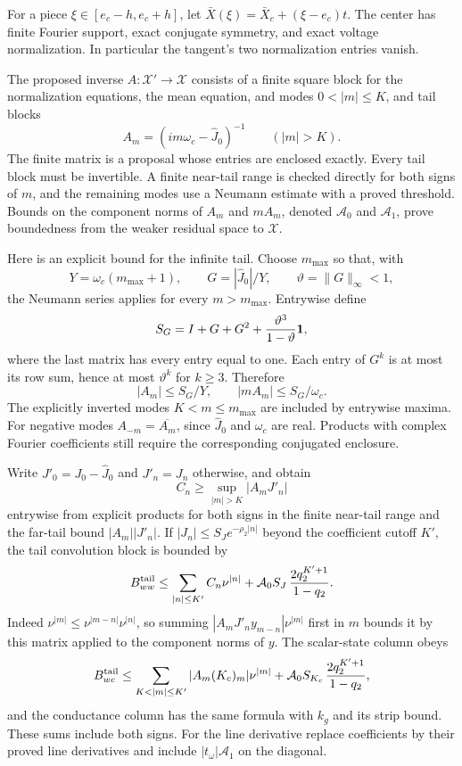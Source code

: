\documentclass[11pt]{article}
\theoremstyle{definition}
\begin{document}
For a piece $\xi\in[e_c-h,e_c+h]$, let
$\bar X(\xi)=\bar X_c+(\xi-e_c)t$.
The center has finite Fourier support, exact conjugate symmetry, and exact voltage normalization. In particular the tangent's two normalization entries vanish.

The proposed inverse $A:\mathcal X'\to\mathcal X$ consists of a finite square block for the normalization equations, the mean equation, and modes $0<|m|\le K$, and tail blocks
\[
 A_m=(im\omega_c-\widehat J_0)^{-1}\qquad(|m|>K).
\]
The finite matrix is a proposal whose entries are enclosed exactly. Every tail block must be invertible. A finite near-tail range is checked directly for both signs of $m$, and the remaining modes use a Neumann estimate with a proved threshold. Bounds on the component norms of $A_m$ and $mA_m$, denoted $\mathcal A_0$ and $\mathcal A_1$, prove boundedness from the weaker residual space to $\mathcal X$.

Here is an explicit bound for the infinite tail. Choose $m_{\max}$ so that, with
\[
 Y=\omega_c(m_{\max}+1),\qquad
 G=|\widehat J_0|/Y,\qquad\vartheta=\|G\|_\infty<1,
\]
the Neumann series applies for every $m>m_{\max}$. Entrywise define
\[
 S_G=I+G+G^2+\frac{\vartheta^3}{1-\vartheta}{\bf1},
\]
where the last matrix has every entry equal to one. Each entry of $G^k$ is at most its row sum, hence at most $\vartheta^k$ for $k\ge3$. Therefore
\[
 |A_m|\le S_G/Y,\qquad |m A_m|\le S_G/\omega_c.
\]
The explicitly inverted modes $K<m\le m_{\max}$ are included by entrywise maxima. For negative modes $A_{-m}=\overline{A_m}$, since $\widehat J_0$ and $\omega_c$ are real. Products with complex Fourier coefficients still require the corresponding conjugated enclosure.

Write $J'_0=J_0-\widehat J_0$ and $J'_n=J_n$ otherwise, and obtain
\[
 C_n\ge\sup_{|m|>K}|A_mJ'_n|
\]
entrywise from explicit products for both signs in the finite near-tail range and the far-tail bound $|A_m||J'_n|$. If $|J_n|\le S_Je^{-\rho_2|n|}$ beyond the coefficient cutoff $K'$, the tail convolution block is bounded by
\[
 B_{ww}^{\rm tail}\le
 \sum_{|n|\le K'}C_n\nu^{|n|}
 +\mathcal A_0 S_J\,\frac{2q_2^{K'+1}}{1-q_2}.
\]
Indeed $\nu^{|m|}\le\nu^{|m-n|}\nu^{|n|}$, so summing $|A_mJ'_ny_{m-n}|\nu^{|m|}$ first in $m$ bounds it by this matrix applied to the component norms of $y$. The scalar-state column obeys
\[
 B_{wc}^{\rm tail}\le
 \sum_{K<|m|\le K'}|A_m(K_c)_m|\nu^{|m|}
 +\mathcal A_0 S_{K_c}\,\frac{2q_2^{K'+1}}{1-q_2},
\]
and the conductance column has the same formula with $k_g$ and its strip bound. These sums include both signs. For the line derivative replace coefficients by their proved line derivatives and include $|t_\omega|\mathcal A_1$ on the diagonal.
\end{document}
